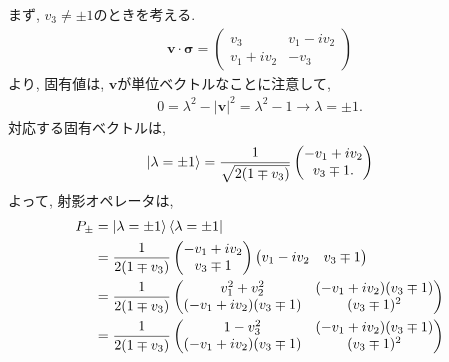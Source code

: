 \begin{ex}
    \label{ex2.60}
    まず, $v_3 \neq \pm 1$のときを考える.
    \begin{align*}
        \bm{v} \cdot \bm{\sigma}
        =
        \begin{pmatrix}
            v_3         & v_1 - i v_2 \\
            v_1 + i v_2 & - v_3
        \end{pmatrix}
    \end{align*}
    より, 固有値は, $\bm{v}$が単位ベクトルなことに注意して,
    \begin{align*}
        0 = \lambda^2 - |\bm{v}|^2 = \lambda^2 - 1
        \to \lambda = \pm1.
    \end{align*}
    対応する固有ベクトルは,
    \begin{align*}
        \ket{\lambda=\pm1} =
        \frac{1}{\sqrt{2(1\mp v_3)}}
        \begin{pmatrix}
            -v_1 + i v_2 \\ v_3 \mp 1.
        \end{pmatrix}
    \end{align*}
    よって, 射影オペレータは,
    \begin{align*}
        P_{\pm}
         & = \ket{\lambda = \pm1} \bra{\lambda = \pm1} \\
         & =
        \frac{1}{2(1\mp v_3)}
        \begin{pmatrix}
            -v_1 + i v_2 \\ v_3 \mp 1
        \end{pmatrix}
        \begin{pmatrix}
            v_1 - i v_2 & v_3 \mp 1
        \end{pmatrix}                    \\
         & =
        \frac{1}{2(1\mp v_3)}
        \begin{pmatrix}
            v_1^2 + v_2^2            & (-v_1 + i v_2)(v_3 \mp1) \\
            (-v_1 + i v_2)(v_3 \mp1) & (v_3 \mp 1)^2
        \end{pmatrix}                    \\
         & =
        \frac{1}{2(1\mp v_3)}
        \begin{pmatrix}
            1 - v_3^2                & (-v_1 + i v_2)(v_3 \mp1) \\
            (-v_1 + i v_2)(v_3 \mp1) & (v_3 \mp 1)^2
        \end{pmatrix}                    \\

\end{align*}
\end{ex}
